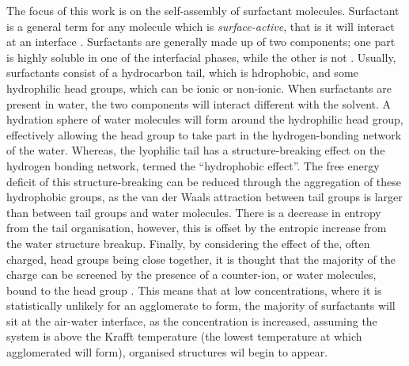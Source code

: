 The focus of this work is on the self-assembly of surfactant molecules.
Surfactant is a general term for any molecule which is \emph{surface-active}, that is it will interact at an interface \cite{rosen_surfactants_2012}.
Surfactants are generally made up of two components; one part is highly soluble in one of the interfacial phases, while the other is not \cite{goodwin_colloids_2009}.
Usually, surfactants consist of a hydrocarbon tail, which is hdrophobic, and some hydrophilic head groups, which can be ionic or non-ionic.
When surfactants are present in water, the two components will interact different with the solvent.
A hydration sphere of water molecules will form around the hydrophilic head group, effectively allowing the head group to take part in the hydrogen-bonding network of the water.
Whereas, the lyophilic tail has a structure-breaking effect on the hydrogen bonding network, termed the ``hydrophobic effect''.
The free energy deficit of this structure-breaking can be reduced through the aggregation of these hydrophobic groups, as the van der Waals attraction between tail groups is larger than between tail groups and water molecules.
There is a decrease in entropy from the tail organisation, however, this is offset by the entropic increase from the water structure breakup.
Finally, by considering the effect of the, often charged, head groups being close together, it is thought that the majority of the charge can be screened by the presence of a counter-ion, or water molecules, bound to the head group \cite{goodwin_colloids_2009}.
This means that at low concentrations, where it is statistically unlikely for an agglomerate to form, the majority of surfactants will sit at the air-water interface, as the concentration is increased, assuming the system is above the Krafft temperature (the lowest temperature at which agglomerated will form), organised structures wil begin to appear.


